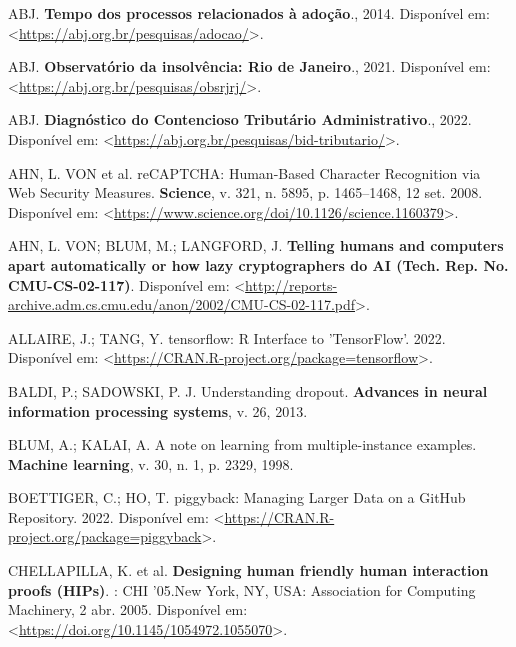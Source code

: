 \documentclass[12pt,twoside,brazilian]{book}
\newlength{\cslhangindent}
\newlength{\cslentryspacingunit} %
\newenvironment{CSLReferences}[2] %
 {%
  \setlength{\parindent}{0pt}
  \ifodd #1
  \let\oldpar\par
  \def\par{\hangindent=\cslhangindent\oldpar}
  \fi
  \setlength{\parskip}{#2\cslentryspacingunit}
 }%
 {}
\begin{document}
\hypertarget{refs}{}
\begin{CSLReferences}{0}{1}
\leavevmode{}%
ABJ. \textbf{Tempo dos processos relacionados à adoção}., 2014.
Disponível em:
\textless{}\url{https://abj.org.br/pesquisas/adocao/}\textgreater.

\leavevmode{}%
ABJ. \textbf{Observatório da insolvência: Rio de Janeiro}., 2021.
Disponível em:
\textless{}\url{https://abj.org.br/pesquisas/obsrjrj/}\textgreater.

\leavevmode{}%
ABJ. \textbf{Diagnóstico do Contencioso Tributário Administrativo}.,
2022. Disponível em:
\textless{}\url{https://abj.org.br/pesquisas/bid-tributario/}\textgreater.

\leavevmode{}%
AHN, L. VON et al. reCAPTCHA: Human-Based Character Recognition via Web
Security Measures. \textbf{Science}, v. 321, n. 5895, p. 1465--1468, 12
set. 2008. Disponível em:
\textless{}\url{https://www.science.org/doi/10.1126/science.1160379}\textgreater.

\leavevmode{}%
AHN, L. VON; BLUM, M.; LANGFORD, J. \textbf{Telling humans and computers
apart automatically or how lazy cryptographers do AI (Tech. Rep. No.
CMU-CS-02-117)}. Disponível em:
\textless{}\url{http://reports-archive.adm.cs.cmu.edu/anon/2002/CMU-CS-02-117.pdf}\textgreater.

\leavevmode{}%
ALLAIRE, J.; TANG, Y. tensorflow: R Interface to 'TensorFlow'. 2022.
Disponível em:
\textless{}\url{https://CRAN.R-project.org/package=tensorflow}\textgreater.

\leavevmode{}%
BALDI, P.; SADOWSKI, P. J. Understanding dropout. \textbf{Advances in
neural information processing systems}, v. 26, 2013.

\leavevmode{}%
BLUM, A.; KALAI, A. A note on learning from multiple-instance examples.
\textbf{Machine learning}, v. 30, n. 1, p. 2329, 1998.

\leavevmode{}%
BOETTIGER, C.; HO, T. piggyback: Managing Larger Data on a GitHub
Repository. 2022. Disponível em:
\textless{}\url{https://CRAN.R-project.org/package=piggyback}\textgreater.

\leavevmode{}%
CHELLAPILLA, K. et al. \textbf{Designing human friendly human
interaction proofs (HIPs)}. : CHI '05.New York, NY, USA: Association for
Computing Machinery, 2 abr. 2005. Disponível em:
\textless{}\url{https://doi.org/10.1145/1054972.1055070}\textgreater.


\end{CSLReferences}
\end{document}
